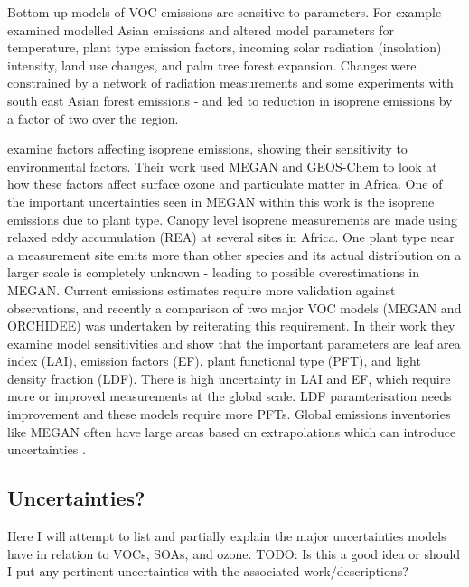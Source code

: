     Bottom up models of VOC emissions are sensitive to parameters.
    For example \textcite{Stavrakou2014} examined modelled Asian emissions and altered model parameters for temperature, plant type emission factors, incoming solar radiation (insolation) intensity, land use changes, and palm tree forest expansion.
    Changes were constrained by a network of radiation measurements and some experiments with south east Asian forest emissions - and led to reduction in isoprene emissions by a factor of two over the region.
    
    
    
    \textcite{Marais2014} examine factors affecting isoprene emissions, showing their sensitivity to environmental factors.
    Their work used MEGAN \parencite{Guenther1995} and GEOS-Chem to look at how these factors affect surface ozone and particulate matter in Africa.
    One of the important uncertainties seen in MEGAN within this work is the isoprene emissions due to plant type.
    Canopy level isoprene measurements are made using relaxed eddy accumulation (REA) at several sites in Africa.
    One plant type near a measurement site emits more than other species and its actual distribution on a larger scale is completely unknown - leading to possible overestimations in MEGAN.
    Current emissions estimates require more validation against observations, and recently a comparison of two major VOC models (MEGAN and ORCHIDEE) was undertaken by \textcite{Messina2016} reiterating this requirement.
    In their work they examine model sensitivities and show that the important parameters are leaf area index (LAI), emission factors (EF), plant functional type (PFT), and light density fraction (LDF).
    There is high uncertainty in LAI and EF, which require more or improved measurements at the global scale.
    LDF paramterisation needs improvement and these models require more PFTs.
    Global emissions inventories like MEGAN often have large areas based on extrapolations which can introduce uncertainties \parencite{Miller2014}.
  
  
  \subsection{Uncertainties?}
  \label{LR:Models:Uncert}
    
    Here I will attempt to list and partially explain the major uncertainties models have in relation to  VOCs, SOAs, and ozone. 
    TODO: Is this a good idea or should I put any pertinent uncertainties with the associated work/descriptions?
    
